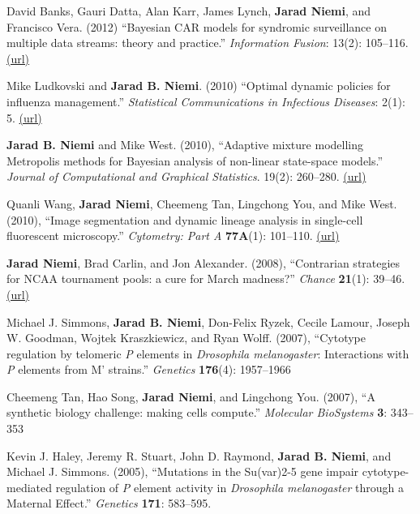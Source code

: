 \documentclass[overlapped,line]{res}
\begin{document}
\begin{resume}
David Banks, Gauri Datta, Alan Karr, James Lynch, {\bf Jarad Niemi}, and Francisco Vera. (2012) ``Bayesian CAR models for syndromic surveillance on multiple data streams: theory and practice.'' \emph{Information Fusion}: 13(2): 105--116. \href{http://www.sciencedirect.com/science/article/pii/S156625350900092X}{(url)}

Mike Ludkovski and {\bf Jarad B. Niemi}. (2010) ``Optimal dynamic policies for influenza management.'' \emph{Statistical Communications in Infectious Diseases}: 2(1): 5. \href{http://www.degruyter.com/view/j/scid.2010.2.1/scid.2010.2.1.1020/scid.2010.2.1.1020.xml}{(url)}

{\bf Jarad B. Niemi} and Mike West. (2010), ``Adaptive mixture modelling Metropolis methods for Bayesian analysis of non-linear state-space models.'' \emph{Journal of Computational and Graphical Statistics}. 19(2): 260--280. \href{http://www.tandfonline.com/doi/abs/10.1198/jcgs.2010.08117}{(url)}

Quanli Wang, {\bf Jarad Niemi}, Cheemeng Tan, Lingchong You, and Mike West. (2010), ``Image segmentation and dynamic lineage analysis in single-cell fluorescent microscopy.'' \emph{Cytometry: Part A} {\bf 77A}(1): 101--110. \href{http://onlinelibrary.wiley.com/doi/10.1002/cyto.a.20812/full}{(url)}

{\bf Jarad Niemi}, Brad Carlin, and Jon Alexander. (2008), ``Contrarian strategies for NCAA tournament pools: a cure for March madness?'' \emph{Chance} {\bf 21}(1): 39--46. \href{http://amstat.tandfonline.com/doi/pdf/10.1080/09332480.2008.10722884}{(url)}


Michael J. Simmons, {\bf Jarad B. Niemi}, Don-Felix Ryzek, Cecile Lamour, Joseph W. Goodman, Wojtek Kraszkiewicz, and Ryan Wolff. (2007), ``Cytotype regulation by telomeric \emph{P} elements in \emph{Drosophila melanogaster}: Interactions with \emph{P} elements from M' strains.'' \emph{Genetics} {\bf 176}(4): 1957--1966

Cheemeng Tan, Hao Song, {\bf Jarad Niemi}, and Lingchong You. (2007), ``A synthetic biology challenge: making cells compute.'' \emph{Molecular BioSystems}  {\bf 3}: 343--353

Kevin J. Haley, Jeremy R. Stuart, John D. Raymond, {\bf Jarad B. Niemi}, and Michael J. Simmons. (2005), ``Mutations in the Su(var)2-5 gene impair cytotype-mediated regulation of \emph{P} element activity in \emph{Drosophila melanogaster} through a Maternal Effect.'' \emph{Genetics} {\bf 171}: 583--595.







\end{resume}
\end{document}
